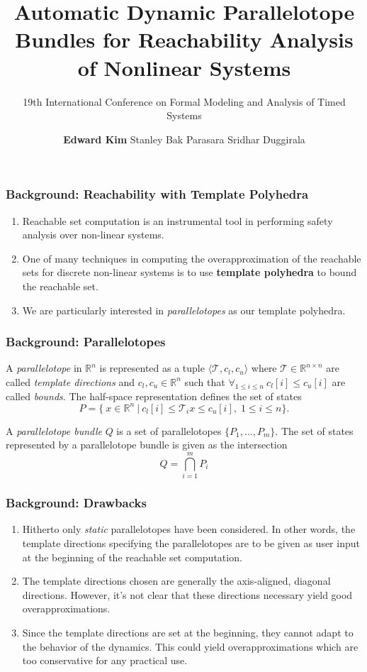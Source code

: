 \documentclass{beamer}
\title{\textbf{Automatic Dynamic Parallelotope Bundles for Reachability Analysis of Nonlinear Systems}}
\subtitle{
  19th International Conference on Formal Modeling and Analysis of Timed Systems}
\date{}
\author{\textbf{Edward Kim}\inst{1} \newline
        Stanley Bak\inst{2} \newline
        Parasara Sridhar Duggirala\inst{1}}
\institute{\inst{1}University of North Carolina at Chapel Hill \newline \inst{2}Stony Brook University}
\begin{document}
\begin{frame}
\titlepage
\end{frame}

\begin{frame}
  \frametitle{\textbf{Background:} Reachability with Template Polyhedra}
  \begin{enumerate}
    \item Reachable set computation is an instrumental tool in performing safety analysis over non-linear systems.
    \item One of many techniques in computing the overapproximation of the reachable sets for discrete non-linear systems is to use \textbf{template polyhedra} to bound the reachable set.
    \item We are particularly interested in \emph{parallelotopes} as our template polyhedra.
  \end{enumerate}
\end{frame}

\begin{frame}
  \frametitle{\textbf{Background:} Parallelotopes}
  \begin{definition}
    A \emph{parallelotope} in $\mathbb{R}^n$ is represented as a tuple $\langle \mathcal{T}, c_{l}, c_{u} \rangle$ where $\mathcal{T} \in \mathbb{R}^{n \times n}$ are called \emph{template directions} and $c_{l}, c_{u} \in \mathbb{R}^{n}$ such that $\forall_{1 \leq i \leq n} ~  c_{l}[i] \leq c_{u}[i]$ are called \emph{bounds}. The half-space representation defines the set of states
    $$
    P = \{\: x \in \mathbb{R}^n \: | \: c_{l}[i] \leq \mathcal{T}_{i}x \leq c_{u}[i], \; 1 \leq i \leq n \}.
    $$
   \end{definition}
   \begin{definition}
     A \emph{parallelotope bundle} $Q$ is a set of parallelotopes $\{P_1, \ldots, P_m\}$. The set of states represented by a parallelotope bundle is given as the intersection
   \[ Q = \bigcap_{i=1}^m P_i \]
   \end{definition}
\end{frame}

\begin{frame}
  \frametitle{\textbf{Background:} Drawbacks}
  \begin{enumerate}
    \item Hitherto only \emph{static} parallelotopes have been considered. In other words, the template directions specifying the parallelotopes are to be given as user input at the beginning of the reachable set computation.
    \item The template directions chosen are generally the axis-aligned, diagonal directions. However, it's not clear that these directions necessary yield good overapproximations.
    \item Since the template directions are set at the beginning, they cannot adapt to the behavior of the dynamics. This could yield overapproximations which are too conservative for any practical use.
  \end{enumerate}
\end{frame}
\end{document}
